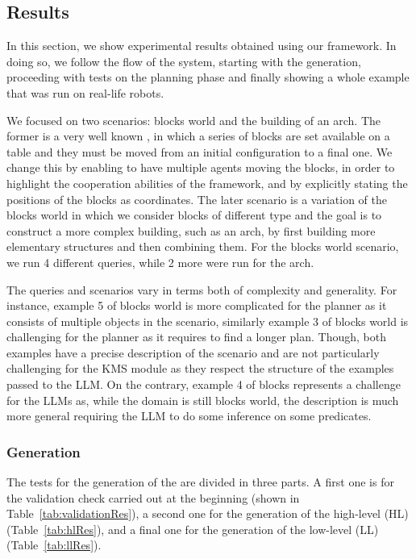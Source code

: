 \subsection{Results}\label{ssec:results}

In this section, we show experimental results obtained using our
framework. In doing so, we follow the flow of the system, starting
with the \kb generation, proceeding with tests on the planning phase
and finally showing a whole example that was run on real-life robots.

We focused on two scenarios: blocks world and the building of an
arch. The former is a very well known \ucase\cite{blocksworld}, in
which a series of blocks are set available on a table and they must be
moved from an initial configuration to a final one. We change
this \ucase by enabling to have multiple agents moving the blocks, in
order to highlight the cooperation abilities of the framework, and by
explicitly stating the positions of the blocks as coordinates. The
later scenario is a variation of the blocks world in which we consider
blocks of different type and the goal is to construct a more complex
building, such as an arch, by first building more elementary
structures and then combining them. For the blocks world scenario, we
run 4 different queries, while 2 more were run for the arch.

The queries and scenarios vary in terms both of complexity and
generality. For instance, example 5 of blocks world is more
complicated for the planner as it consists of multiple objects in the
scenario, similarly example 3 of blocks world is challenging for the
planner as it requires to find a longer plan. Though, both examples
have a precise description of the scenario and are not particularly
challenging for the KMS module as they respect the structure of the
examples passed to the LLM. On the contrary, example 4 of blocks
represents a challenge for the LLMs as, while the domain is still
blocks world, the description is much more general requiring the LLM
to do some inference on some predicates.

\subsubsection{\kb Generation} 
\label{sssec:kbgenvalidation}
The tests for the generation of the \kb are divided in three parts. A first one is for the validation check carried out at the beginning (shown in Table~\ref{tab:validationRes}), a second one for the generation of the high-level (HL) \kb (Table~\ref{tab:hlRes}), and a final one for the generation of the low-level (LL) \kb (Table~\ref{tab:llRes}). 

